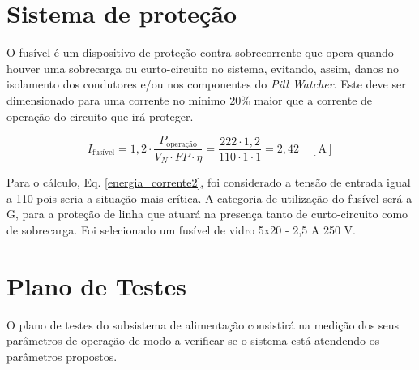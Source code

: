 


\section{Sistema de proteção}

O fusível é um dispositivo de proteção contra sobrecorrente que opera quando houver uma sobrecarga ou curto-circuito no sistema, evitando, assim, danos no isolamento dos condutores e/ou nos componentes do \textit{Pill Watcher}. Este deve ser dimensionado para uma corrente no mínimo 20\% maior que a corrente de operação do circuito que irá proteger.

    \begin{equation}
        I_\text{fusível} = 1,2 \cdot \frac{P_\text{operação}}{V_{N} \cdot FP \cdot \eta} = \frac{222 \cdot 1,2}{110 \cdot 1 \cdot 1} = 2,42 \quad [\text{A}]
        \label{energia_corrente2}
    \end{equation}
    
Para o cálculo, Eq. \ref{energia_corrente2}, foi considerado a tensão de entrada igual a 110 pois seria a situação mais crítica. A categoria de utilização do fusível será a G, para a proteção de linha que atuará na presença tanto de curto-circuito como de sobrecarga. Foi selecionado um fusível de vidro 5x20 - 2,5 A 250 V. 

\section{Plano de Testes}\label{sec:plano_teste_energia}

O plano de testes do subsistema de alimentação consistirá na medição dos seus parâmetros de operação de modo a verificar se o sistema está atendendo os parâmetros propostos. 

